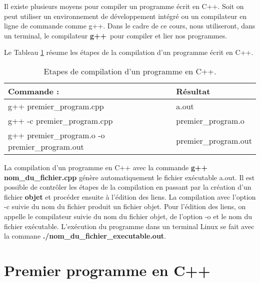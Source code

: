 \documentclass[a4paper, oneside,11pt]{book}
\begin{document}
Il existe plusieurs moyens pour compiler un programme \'ecrit en C++. Soit on peut utiliser un environnement de d\'eveloppement int\'egr\'e ou un compilateur en ligne de  commande 
comme g++. Dans le cadre de ce cours, nous utiliseront, dans un terminal,  le compilateur \og\textbf{g++}\fg\ pour compiler et lier nos programmes.

Le Tableau \ref{comp1} r\'esume les \'etapes de la compilation d'un programme \'ecrit en C++.
 \begin{table}[hhhh]
 \begin{center}
 \begin{tabular}{|l|l|}
 \hline
 \textbf{Commande} : &\textbf{R\'esultat }\\
 \hline
 g++ premier\_program.cpp& a.out\\
 \hline
 g++ -c premier\_program.cpp & premier\_program.o\\
 \hline
 g++ premier\_program.o -o premier\_program.out & premier\_program.out\\
 \hline
 \end{tabular}
 \vspace{-0.25cm}\caption{Etapes de compilation d'un programme en C++.} \label{comp1}
 \end{center}
 \end{table}

La compilation d'un programme en C++ avec la commande \textbf{g++ nom\_du\_fichier.cpp} g\'en\`ere automatiquement le fichier ex\'ecutable \og a.out\fg. Il est possible de contr\^oler
les \'etapes de la compilation en passant par la cr\'eation d'un fichier \textbf{objet} et proc\'eder ensuite \`a l'\'edition des liens. La compilation avec l'option -c suivie du nom du 
fichier produit un fichier objet. Pour l'\'edition des liens, on appelle le compilateur  suivie  du nom  du fichier objet, de l'option -o et le nom du fichier ex\'ecutable. 
L'ex\'ecution du programme dans un terminal Linux se fait avec la commane \textbf{./nom\_du\_fichier\_executable.out}. 

\section{Premier programme en C++}
\end{document}
